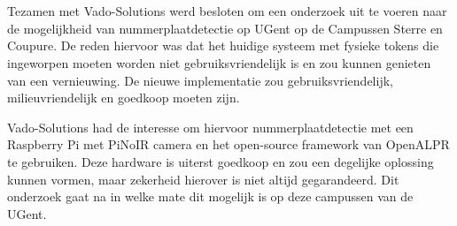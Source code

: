 
%
%




\chapter*{}

Tezamen met Vado-Solutions werd besloten om een onderzoek uit te voeren naar de mogelijkheid van nummerplaatdetectie op UGent op de Campussen Sterre en Coupure. De reden hiervoor was dat het huidige systeem met fysieke tokens die ingeworpen moeten worden niet gebruiksvriendelijk is en zou kunnen genieten van een vernieuwing. De nieuwe implementatie zou gebruiksvriendelijk, milieuvriendelijk en goedkoop moeten zijn.

Vado-Solutions had de interesse om hiervoor nummerplaatdetectie met een Raspberry Pi met PiNoIR camera en het open-source framework van OpenALPR te gebruiken. Deze hardware is uiterst goedkoop en zou een degelijke oplossing kunnen vormen, maar zekerheid hierover is niet altijd gegarandeerd. Dit onderzoek gaat na in welke mate dit mogelijk is op deze campussen van de UGent.

